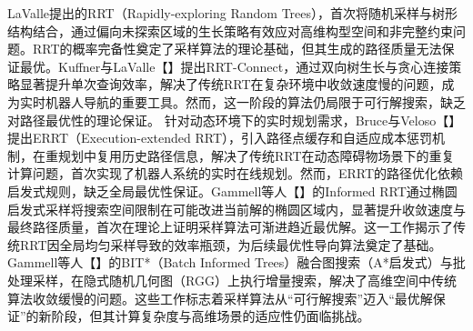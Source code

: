 \documentclass[master,academic]{ysuthesis} %
\begin{document}
		LaValle提出的RRT（Rapidly-exploring Random Trees），首次将随机采样与树形结构结合，通过偏向未探索区域的生长策略有效应对高维构型空间和非完整约束问题。RRT的概率完备性​奠定了采样算法的理论基础，但其生成的路径质量无法保证最优。Kuffner与LaValle【】提出RRT-Connect，通过双向树生长与贪心连接策略显著提升单次查询效率，解决了传统RRT在复杂环境中收敛速度慢的问题，成为实时机器人导航的重要工具。然而，这一阶段的算法仍局限于可行解搜索，缺乏对路径最优性的理论保证。
		针对动态环境下的实时规划需求，Bruce与Veloso【】提出ERRT（Execution-extended RRT），引入路径点缓存和自适应成本惩罚机制，在重规划中复用历史路径信息，解决了传统RRT在动态障碍物场景下的重复计算问题，首次实现了机器人系统的实时在线规划。然而，ERRT的路径优化依赖启发式规则，缺乏全局最优性保证。Gammell等人【】的Informed RRT​ 通过椭圆启发式采样将搜索空间限制在可能改进当前解的椭圆区域内，显著提升收敛速度与最终路径质量，首次在理论上证明采样算法可渐进趋近最优解。这一工作揭示了传统RRT因全局均匀采样导致的效率瓶颈，为后续最优性导向算法奠定了基础。
		Gammell等人【】的BIT*（Batch Informed Trees）融合图搜索（A*启发式）与批处理采样，在隐式随机几何图（RGG）上执行增量搜索，解决了高维空间中传统算法收敛缓慢的问题。这些工作标志着采样算法从“可行解搜索”迈入“最优解保证”的新阶段，但其计算复杂度与高维场景的适应性仍面临挑战。
\end{document}
